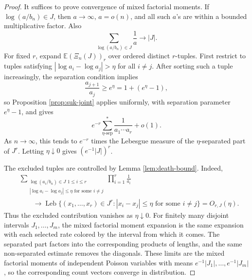 \documentclass[11pt]{article}
\theoremstyle{remark}
\newcommand{\Ee}{\mathbb E}
\begin{document}
\begin{proof}
It suffices to prove convergence of mixed factorial moments.  If \(\log(a/b_n)\in J\), then \(a\to\infty\), \(a=o(n)\), and all such \(a\)'s are within a bounded multiplicative factor.  Also
\[
        \sum_{\log(a/b_n)\in J}\frac1a\to |J|.
\]
For fixed \(r\), expand \(\Ee(\Xi_n(J))_r\) over ordered distinct \(r\)-tuples.  First restrict to tuples satisfying \(|\log a_i-\log a_j|>\eta\) for all \(i\ne j\).  After sorting such a tuple increasingly, the separation condition implies
\[
        \frac{a_{j+1}}{a_j}\ge e^\eta=1+(e^\eta-1),
\]
so Proposition \ref{prop:suk-joint} applies uniformly, with separation parameter \(e^\eta-1\), and gives
\[
        e^{-r}\sum_{\eta\text{-sep}}^*\frac1{a_1\cdots a_r}+o(1).
\]
As \(n\to\infty\), this tends to \(e^{-r}\) times the Lebesgue measure of the \(\eta\)-separated part of \(J^r\).  Letting \(\eta\downarrow0\) gives \((e^{-1}|J|)^r\).

The excluded tuples are controlled by Lemma \ref{lem:death-bound}.  Indeed,
\[
\begin{aligned}
&\sum_{\substack{\log(a_i/b_n)\in J\,\,1\le i\le r\\
        |\log a_i-\log a_j|\le\eta\text{ for some }i\ne j}}
        \prod_{i=1}^r\frac1{a_i} \\
&\qquad\longrightarrow
        \operatorname{Leb}\{(x_1,\ldots,x_r)\in J^r:
        |x_i-x_j|\le\eta\text{ for some }i\ne j\}
        =O_{r,J}(\eta).
\end{aligned}
\]
Thus the excluded contribution vanishes as \(\eta\downarrow0\).  For finitely many disjoint intervals \(J_1,\ldots,J_m\), the mixed factorial moment expansion is the same expansion with each selected rate colored by the interval from which it comes.  The separated part factors into the corresponding products of lengths, and the same non-separated estimate removes the diagonals.  These limits are the mixed factorial moments of independent Poisson variables
with means \(e^{-1}|J_1|,\ldots,e^{-1}|J_m|\), so the corresponding count
vectors converge in distribution.


\end{proof}
\end{document}
